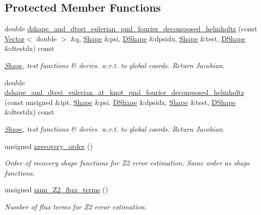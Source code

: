 \subsection*{Protected Member Functions}
\begin{DoxyCompactItemize}
\item 
double \hyperlink{classoomph_1_1TPMLFourierDecomposedHelmholtzElement_a7f93fbda57b10da922c7e1db0698b866}{dshape\+\_\+and\+\_\+dtest\+\_\+eulerian\+\_\+pml\+\_\+fourier\+\_\+decomposed\+\_\+helmholtz} (const \hyperlink{classoomph_1_1Vector}{Vector}$<$ double $>$ \&\hyperlink{cfortran_8h_ab7123126e4885ef647dd9c6e3807a21c}{s}, \hyperlink{classoomph_1_1Shape}{Shape} \&psi, \hyperlink{classoomph_1_1DShape}{D\+Shape} \&dpsidx, \hyperlink{classoomph_1_1Shape}{Shape} \&test, \hyperlink{classoomph_1_1DShape}{D\+Shape} \&dtestdx) const
\begin{DoxyCompactList}\small\item\em \hyperlink{classoomph_1_1Shape}{Shape}, test functions \& derivs. w.\+r.\+t. to global coords. Return Jacobian. \end{DoxyCompactList}\item 
double \hyperlink{classoomph_1_1TPMLFourierDecomposedHelmholtzElement_a745a27ed6efc2d33114b7f380b132a27}{dshape\+\_\+and\+\_\+dtest\+\_\+eulerian\+\_\+at\+\_\+knot\+\_\+pml\+\_\+fourier\+\_\+decomposed\+\_\+helmholtz} (const unsigned \&ipt, \hyperlink{classoomph_1_1Shape}{Shape} \&psi, \hyperlink{classoomph_1_1DShape}{D\+Shape} \&dpsidx, \hyperlink{classoomph_1_1Shape}{Shape} \&test, \hyperlink{classoomph_1_1DShape}{D\+Shape} \&dtestdx) const
\begin{DoxyCompactList}\small\item\em \hyperlink{classoomph_1_1Shape}{Shape}, test functions \& derivs. w.\+r.\+t. to global coords. Return Jacobian. \end{DoxyCompactList}\item 
unsigned \hyperlink{classoomph_1_1TPMLFourierDecomposedHelmholtzElement_a3ce095632914ab937a3e23278388d4bc}{nrecovery\+\_\+order} ()
\begin{DoxyCompactList}\small\item\em Order of recovery shape functions for Z2 error estimation\+: Same order as shape functions. \end{DoxyCompactList}\item 
unsigned \hyperlink{classoomph_1_1TPMLFourierDecomposedHelmholtzElement_a51c4dd153b88d0854da83b9c83f96f26}{num\+\_\+\+Z2\+\_\+flux\+\_\+terms} ()
\begin{DoxyCompactList}\small\item\em Number of \textquotesingle{}flux\textquotesingle{} terms for Z2 error estimation. \end{DoxyCompactList}\item 

\end{DoxyCompactItemize}
